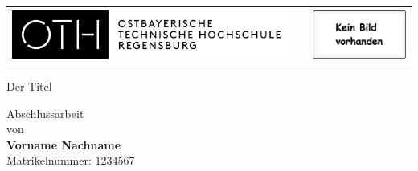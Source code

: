 %
%

\begin{titlepage}


\FloatBarrier
\begin{table}[htb]\vspace{1ex}\centering
\begin{tabular}{ccc}
 \includegraphics[height=1.7cm]{img/logo_OTH.png}
   &    &
 \includegraphics[height=1.7cm]{img/kein_bild_vorhanden.eps}
   \\
\end{tabular}
\end{table}
\FloatBarrier


%

\begin{center}
\rule{0pt}{0pt}
\vfill
\vfill
\vfill
\vfill

\begin{huge}
Der Titel  \\[0.75ex]
\end{huge}

\vfill
\vfill

Abschlussarbeit\\ von\\

\vspace*{.5cm}
\textbf{Vorname Nachname}\\
Matrikelnummer: 1234567
\vspace{.5cm}


\end{center}
\end{titlepage}
